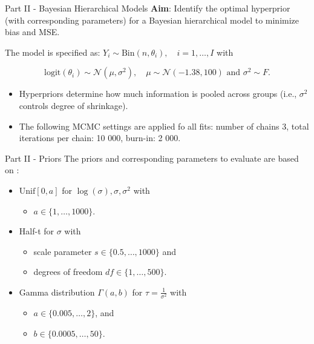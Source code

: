 \documentclass[
  ignorenonframetext,
  aspectratio=169]{beamer}
\providecommand{\tightlist}{%
  \setlength{\itemsep}{0pt}\setlength{\parskip}{0pt}}
\begin{document}
\begin{frame}{Part II - Bayesian Hierarchical Models}
\protect{}\label{part-ii---bayesian-hierarchical-models}
\textbf{Aim}: Identify the optimal hyperprior (with corresponding
parameters) for a Bayesian hierarchical model to minimize bias and MSE.

The model is specified as:
\(Y_i \sim \mathrm{Bin}(n, \theta_i), \quad i = 1, \dots, I\) with

\[ \mathrm{logit}(\theta_i) \sim \mathcal{N}(\mu, \sigma^2), \quad \mu \sim \mathcal{N}(-1.38, 100) \textrm{ and } \sigma^2 \sim F.\]

\begin{itemize}
\item
  Hyperpriors determine how much information is pooled across groups
  (i.e., \(\sigma^2\) controls degree of shrinkage).
\item
  The following MCMC settings are applied fo all fits: number of chains
  3, total iterations per chain: 10 000, burn-in: 2 000.
\end{itemize}
\end{frame}

\begin{frame}{Part II - Priors}
\protect{}\label{part-ii---priors}
The priors and corresponding parameters to evaluate are based on
\citep{Cunanan}:

\begin{itemize}
\tightlist
\item
  \(\mathrm{Unif}[0, a]\) for \(\log(\sigma), \sigma, \sigma^2\) with

  \begin{itemize}
  \tightlist
  \item
    \(a \in \{1, \dots,  1000\}\).
  \end{itemize}
\item
  Half-t for \(\sigma\) with

  \begin{itemize}
  \tightlist
  \item
    scale parameter \(s \in \{0.5, \dots,  1000\}\) and
  \item
    degrees of freedom \(df \in \{1, \dots,  500\}\).
  \end{itemize}
\item
  Gamma distribution \(\Gamma(a,b)\) for \(\tau = \frac{1}{\sigma^2}\)
  with

  \begin{itemize}
  \tightlist
  \item
    \(a \in \{0.005, \dots,  2 \}\), and
  \item
    \(b \in  \{0.0005, \dots, 50\}\).
  \end{itemize}
\end{itemize}
\end{frame}
\end{document}
